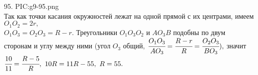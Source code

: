 95. {{PIC:g9-95.png}}\\
Так как точки касания окружностей лежат на одной прямой с их центрами, имеем $O_1O_2=2r,$\\$O_1O_3=O_2O_3=R-r.$ Треугольники $O_1O_3O_2$ и $AO_3B$ подобны по двум сторонам и углу между ними (угол $O_3$ общий, $\cfrac{O_1O_3}{AO_3}=\cfrac{R-r}{R}=\cfrac{O_2O_3}{BO_3}),$ значит $\cfrac{10}{11}=\cfrac{R-5}{R},\ 10R=11R-55,\ R=55.$\\
